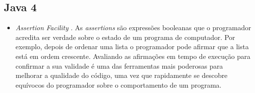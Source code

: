 	\subsection {Java 4}
	  \begin{itemize}
		  \item {\it Assertion Facility} \cite{JSE8_Enhancements}. As {\it assertions} são expressões booleanas que o programador acredita ser verdade sobre o estado de um programa de computador. Por exemplo, depois de ordenar uma lista o programador pode afirmar que a lista está em ordem crescente. Avaliando as afirmações em tempo de execução para confirmar a sua validade é uma das ferramentas mais poderosas para melhorar a qualidade do código, uma vez que rapidamente se descobre equívocos do programador sobre o comportamento de um programa.
	  \end{itemize}
	
